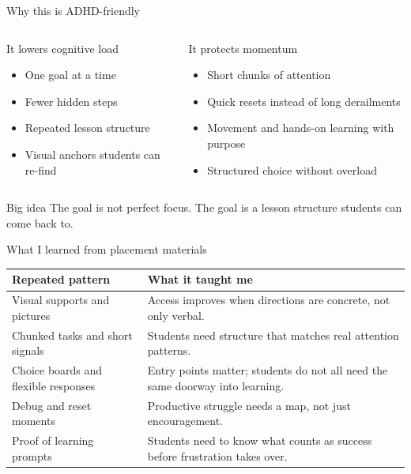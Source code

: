 \documentclass[aspectratio=169,11pt]{beamer}
\newcommand{\claimbox}[1]{
  \begin{block}{Big idea}
  \Large #1
  \end{block}
}
\begin{document}
\begin{frame}{Why this is ADHD-friendly}
\begin{columns}[T]
  \begin{block}{It lowers cognitive load}
  \begin{itemize}
    \item One goal at a time
    \item Fewer hidden steps
    \item Repeated lesson structure
    \item Visual anchors students can re-find
  \end{itemize}
  \end{block}

  \begin{block}{It protects momentum}
  \begin{itemize}
    \item Short chunks of attention
    \item Quick resets instead of long derailments
    \item Movement and hands-on learning with purpose
    \item Structured choice without overload
  \end{itemize}
  \end{block}
\end{columns}

\vspace{0.2cm}
\claimbox{The goal is not perfect focus. The goal is a lesson structure students can come back to.}
\end{frame}

\begin{frame}{What I learned from placement materials}
\small
\begin{tabularx}{\textwidth}{>{\RaggedRight\arraybackslash}p{} >{\RaggedRight\arraybackslash}X}
\toprule
\textbf{Repeated pattern} & \textbf{What it taught me} \\
\midrule
Visual supports and pictures & Access improves when directions are concrete, not only verbal. \\
Chunked tasks and short signals & Students need structure that matches real attention patterns. \\
Choice boards and flexible responses & Entry points matter; students do not all need the same doorway into learning. \\
Debug and reset moments & Productive struggle needs a map, not just encouragement. \\
Proof of learning prompts & Students need to know what counts as success before frustration takes over. \\
\bottomrule
\end{tabularx}
\end{frame}
\end{document}
